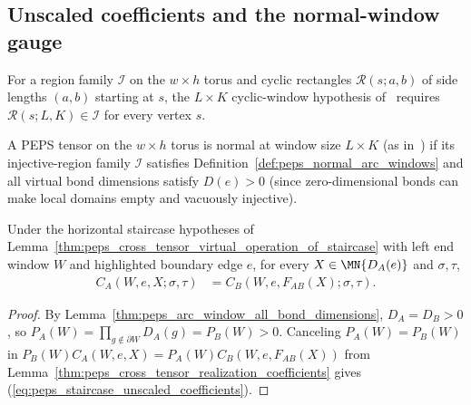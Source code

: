 \subsection{Unscaled coefficients and the normal-window gauge}
\label{subsec:peps_arc_window_transfer}

\begin{definition}%
    \label{def:peps_normal_arc_windows}
    \leanok
    For a region family $\mathcal I$ on the $w\times h$ torus and cyclic
    rectangles $\mathcal R(s;a,b)$ of side lengths $(a,b)$ starting at $s$, the
    $L\times K$ cyclic-window hypothesis of~\cite{Molnar2018NormalPEPS} requires
    $\mathcal R(s;L,K)\in\mathcal I$ for every vertex $s$.
\end{definition}

\begin{definition}%
    \label{def:peps_normal_torus_arc_window_tensor}
    \leanok
    A PEPS tensor on the $w\times h$ torus is normal at window size $L\times K$
    (as in~\cite{Molnar2018NormalPEPS}) if its injective-region family
    $\mathcal I$ satisfies Definition~\ref{def:peps_normal_arc_windows} and all
    virtual bond dimensions satisfy $D(e)>0$ (since zero-dimensional bonds can
    make local domains empty and vacuously injective).
\end{definition}

\begin{lemma}%
    \label{thm:peps_staircase_unscaled_coefficients}
    \leanok
    Under the horizontal staircase hypotheses of
    Lemma~\ref{thm:peps_cross_tensor_virtual_operation_of_staircase} with left
    end window $W$ and highlighted boundary edge $e$, for every
    $X\in\MN{D_A(e)}$ and $\sigma,\tau$,
    \begin{align}
        C_A(W,e,X;\sigma,\tau)
         & =C_B(W,e,F_{AB}(X);\sigma,\tau).
        \label{eq:peps_staircase_unscaled_coefficients}
    \end{align}
\end{lemma}
\begin{proof}
    \leanok
    By Lemma~\ref{thm:peps_arc_window_all_bond_dimensions}, $D_A=D_B>0$, so
    $P_A(W)=\prod_{g\notin\partial W}D_A(g)=P_B(W)>0$. Canceling $P_A(W)=P_B(W)$
    in $P_B(W)C_A(W,e,X)=P_A(W)C_B(W,e,F_{AB}(X))$ from
    Lemma~\ref{thm:peps_cross_tensor_realization_coefficients} gives
    (\ref{eq:peps_staircase_unscaled_coefficients}).
\end{proof}


